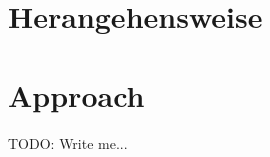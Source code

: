 \ifisGerman
    \chapter{Herangehensweise}
\else
    \chapter{Approach}
\fi
\label{sec:approach}

TODO: Write me...
